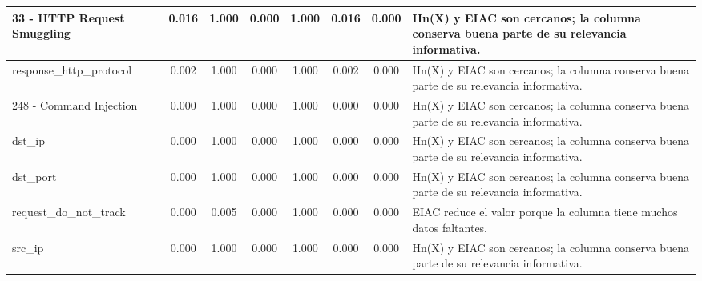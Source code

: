 \begin{table}[h]
\begin{tabular}{|p{3cm}|c|c|c|c|c|c|p{5cm}|}
33 - HTTP Request Smuggling & 0.016 & 1.000 & 0.000 & 1.000 & 0.016 & 0.000 & Hn(X) y EIAC son cercanos; la columna conserva buena parte de su relevancia informativa. \\
\hline
response\_http\_protocol & 0.002 & 1.000 & 0.000 & 1.000 & 0.002 & 0.000 & Hn(X) y EIAC son cercanos; la columna conserva buena parte de su relevancia informativa. \\
\hline
248 - Command Injection & 0.000 & 1.000 & 0.000 & 1.000 & 0.000 & 0.000 & Hn(X) y EIAC son cercanos; la columna conserva buena parte de su relevancia informativa. \\
\hline
dst\_ip & 0.000 & 1.000 & 0.000 & 1.000 & 0.000 & 0.000 & Hn(X) y EIAC son cercanos; la columna conserva buena parte de su relevancia informativa. \\
\hline
dst\_port & 0.000 & 1.000 & 0.000 & 1.000 & 0.000 & 0.000 & Hn(X) y EIAC son cercanos; la columna conserva buena parte de su relevancia informativa. \\
\hline
request\_do\_not\_track & 0.000 & 0.005 & 0.000 & 1.000 & 0.000 & 0.000 & EIAC reduce el valor porque la columna tiene muchos datos faltantes. \\
\hline
src\_ip & 0.000 & 1.000 & 0.000 & 1.000 & 0.000 & 0.000 & Hn(X) y EIAC son cercanos; la columna conserva buena parte de su relevancia informativa. \\
\hline
\end{tabular}
\end{table}
